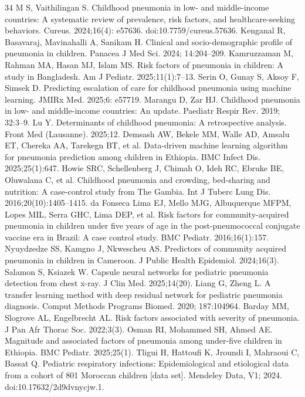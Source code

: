 \documentclass[a4paper,fleqn]{cas-dc}
\begin{document}
\begin{thebibliography}{34}
 M S, Vaithilingan S. Childhood pneumonia in low- and middle-income countries: A systematic review of prevalence, risk factors, and healthcare-seeking behaviors. Cureus. 2024;16(4): e57636. doi:10.7759/cureus.57636.
 Kenganal R, Basavaraj, Mavinahalli A, Sanikam H. Clinical and socio-demographic profile of pneumonia in children. Panacea J Med Sci. 2024; 14:204--209.
 Kamruzzaman M, Rahman MA, Hasan MJ, Islam MS. Risk factors of pneumonia in children: A study in Bangladesh. Am J Pediatr. 2025;11(1):7--13.
 Serin O, Gunay S, Aksoy F, Simsek D. Predicting escalation of care for childhood pneumonia using machine learning. JMIRx Med. 2025;6: e57719.
 Marangu D, Zar HJ. Childhood pneumonia in low- and middle-income countries: An update. Paediatr Respir Rev. 2019; 32:3--9.
 Lu Y. Determinants of childhood pneumonia: A retrospective analysis. Front Med (Lausanne). 2025;12.
 Demsash AW, Bekele MM, Walle AD, Amsalu ET, Chereka AA, Tarekegn BT, et al. Data-driven machine learning algorithm for pneumonia prediction among children in Ethiopia. BMC Infect Dis. 2025;25(1):647.
 Howie SRC, Schellenberg J, Chimah O, Ideh RC, Ebruke BE, Oluwalana C, et al. Childhood pneumonia and crowding, bed-sharing and nutrition: A case-control study from The Gambia. Int J Tuberc Lung Dis. 2016;20(10):1405--1415.
 da Fonseca Lima EJ, Mello MJG, Albuquerque MFPM, Lopes MIL, Serra GHC, Lima DEP, et al. Risk factors for community-acquired pneumonia in children under five years of age in the post-pneumococcal conjugate vaccine era in Brazil: A case control study. BMC Pediatr. 2016;16(1):157.
 Nyuydzedze SS, Kamgno J, Nkwescheu AS. Predictors of community acquired pneumonia in children in Cameroon. J Public Health Epidemiol. 2024;16(3).
 Salamon S, Ksiazek W. Capsule neural networks for pediatric pneumonia detection from chest x-ray. J Clin Med. 2025;14(20).
 Liang G, Zheng L. A transfer learning method with deep residual network for pediatric pneumonia diagnosis. Comput Methods Programs Biomed. 2020; 187:104964.
 Barday MM, Slogrove AL, Engelbrecht AL. Risk factors associated with severity of pneumonia. J Pan Afr Thorac Soc. 2022;3(3).
 Osman RI, Mohammed SH, Ahmed AE. Magnitude and associated factors of pneumonia among under-five children in Ethiopia. BMC Pediatr. 2025;25(1).
 Tligui H, Hattoufi K, Jroundi I, Mahraoui C, Bassat Q. Pediatric respiratory infections: Epidemiological and etiological data from a cohort of 801 Moroccan children [data set]. Mendeley Data, V1; 2024. doi:10.17632/2d9dvnycjw.1.

\end{thebibliography}
\end{document}

